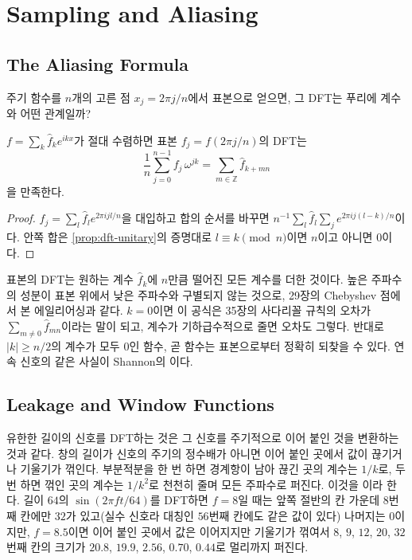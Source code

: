 \section{Sampling and Aliasing}
\label{sec:sampling}

\subsection{The Aliasing Formula}

주기 함수를 $n$개의 고른 점 $x_j=2\pi j/n$에서 표본으로 얻으면, 그 DFT는 푸리에 계수와 어떤 관계일까?

\begin{proposition}
\label{prop:aliasing-dft}
$f=\sum_k\hat f_ke^{ikx}$가 절대 수렴하면 표본 $f_j=f(2\pi j/n)$의 DFT는
\[
\frac1n\sum_{j=0}^{n-1}f_j\,\omega^{jk}=\sum_{m\in\mathbb Z}\hat f_{k+mn}
\]
을 만족한다.
\end{proposition}

\begin{proof}
$f_j=\sum_l\hat f_le^{2\pi ijl/n}$을 대입하고 합의 순서를 바꾸면 $n^{-1}\sum_l\hat f_l\sum_je^{2\pi ij(l-k)/n}$이다. 안쪽 합은 \cref{prop:dft-unitary}의 증명대로 $l\equiv k\pmod n$이면 $n$이고 아니면 $0$이다.
\end{proof}

표본의 DFT는 원하는 계수 $\hat f_k$에 $n$만큼 떨어진 모든 계수를 더한 것이다. 높은 주파수의 성분이 표본 위에서 낮은 주파수와 구별되지 않는 것으로, 29장의 Chebyshev 점에서 본 에일리어싱과 같다. $k=0$이면 이 공식은 35장의 사다리꼴 규칙의 오차가 $\sum_{m\ne0}\hat f_{mn}$이라는 말이 되고, 계수가 기하급수적으로 줄면 오차도 그렇다. 반대로 $|k|\ge n/2$의 계수가 모두 $0$인 함수, 곧  함수는 표본으로부터 정확히 되찾을 수 있다. 연속 신호의 같은 사실이 Shannon의 이다\cite{shannon1949}.

\subsection{Leakage and Window Functions}

유한한 길이의 신호를 DFT하는 것은 그 신호를 주기적으로 이어 붙인 것을 변환하는 것과 같다. 창의 길이가 신호의 주기의 정수배가 아니면 이어 붙인 곳에서 값이 끊기거나 기울기가 꺾인다. 부분적분을 한 번 하면 경계항이 남아 끊긴 곳의 계수는 $1/k$로, 두 번 하면 꺾인 곳의 계수는 $1/k^2$로 천천히 줄며 모든 주파수로 퍼진다. 이것을 이라 한다. 길이 $64$의 $\sin(2\pi ft/64)$를 DFT하면 $f=8$일 때는 앞쪽 절반의 칸 가운데 $8$번째 칸에만 $32$가 있고(실수 신호라 대칭인 $56$번째 칸에도 같은 값이 있다) 나머지는 $0$이지만, $f=8.5$이면 이어 붙인 곳에서 값은 이어지지만 기울기가 꺾여서 $8$, $9$, $12$, $20$, $32$번째 칸의 크기가 $20.8$, $19.9$, $2.56$, $0.70$, $0.44$로 멀리까지 퍼진다.

